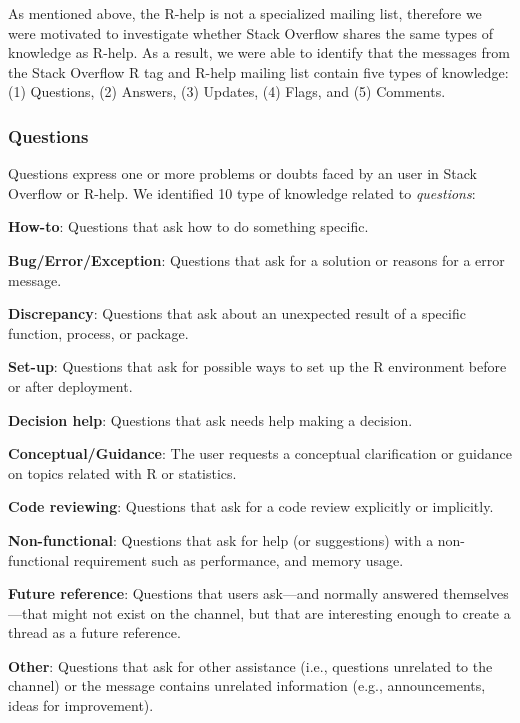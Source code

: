\documentclass{sig-alternate-05-2015}
\begin{document}
	As mentioned above, the R-help is not a specialized mailing list, therefore we were motivated to investigate whether Stack Overflow shares the same types of knowledge as R-help.
	As a result, we were able to identify that the messages from the Stack Overflow R tag and R-help mailing list contain five types of knowledge:
	(1) Questions,
	(2) Answers,
	(3) Updates,
	(4) Flags, and
	(5) Comments.

\subsubsection{Questions}

Questions express one or more problems or doubts faced by an user in Stack Overflow or R-help.
We identified 10 type of knowledge related to \emph{questions}:

	\begin{packed_enum}
	\item \textbf{How-to}: Questions that ask how to do something specific.
	\item \textbf{Bug/Error/Exception}: Questions that ask for a solution or reasons for a error message.
	\item \textbf{Discrepancy}: Questions that ask about an unexpected result of a specific function, process, or package.
	\item \textbf{Set-up}: Questions that ask for possible ways to set up the R environment before or after deployment.
	\item \textbf{Decision help}: Questions that ask needs help making a decision.
	\item \textbf{Conceptual/Guidance}: The user requests a conceptual clarification or guidance on topics related with R or statistics.
	\item \textbf{Code reviewing}: Questions that ask for a code review explicitly or implicitly.
	\item \textbf{Non-functional}: Questions that ask for help (or suggestions) with a non-functional requirement such as performance, and memory usage.
	\item \textbf{Future reference}: Questions that users ask---and normally answered themselves---that might not exist on the channel, but that are interesting enough to create a thread as a future reference.
	\item \textbf{Other}: Questions that ask for other assistance (i.e., questions unrelated to the channel) or the message contains unrelated information (e.g., announcements, ideas for improvement).
	\end{packed_enum}
\end{document}
